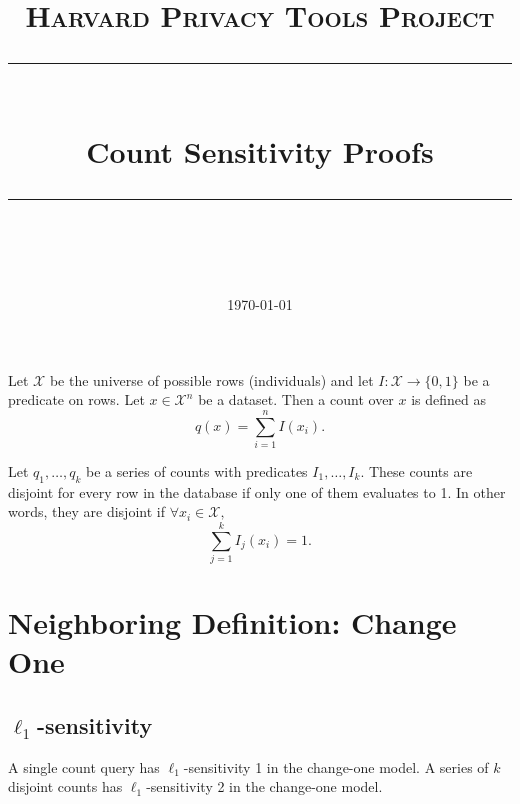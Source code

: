 \documentclass[11pt]{scrartcl} %
\title{
	\normalfont\normalsize
	\textsc{Harvard Privacy Tools Project}\\ %
	\vspace{25pt} %
	\rule{\linewidth}{0.5pt}\\ %
	\vspace{20pt} %
	{\huge Count Sensitivity Proofs}\\ %
	\vspace{12pt} %
	\rule{\linewidth}{2pt}\\ %
	\vspace{12pt} %
}
\date{\normalsize\today} %
\begin{document}
\maketitle

\begin{definition}
Let $\mathcal{X}$ be the universe of possible rows (individuals) and let $I: \mathcal{X} \rightarrow \{0,1\}$ be a predicate on rows. Let $x \in \mathcal{X}^n$ be a dataset. Then a count over $x$ is defined as 
$$ q(x) = \sum_{i=1}^n I(x_i).$$
\end{definition}

\begin{definition}
Let $q_1, \ldots, q_k$ be a series of counts with predicates $I_1, \ldots, I_k$. These counts are disjoint for every row in the database if only one of them evaluates to 1. In other words, they are disjoint if $\forall x_i \in \mathcal{X},$ 
$$ \sum_{j=1}^k I_j(x_i) = 1.$$
\end{definition}

\section{Neighboring Definition: Change One}

\subsection{$\ell_1$-sensitivity}

\begin{theorem}
\label{thm:change1L1}
A single count query has $\ell_1$-sensitivity 1 in the change-one model. A series of $k$ disjoint counts has $\ell_1$-sensitivity 2 in the change-one model.
\end{theorem}
\end{document}
